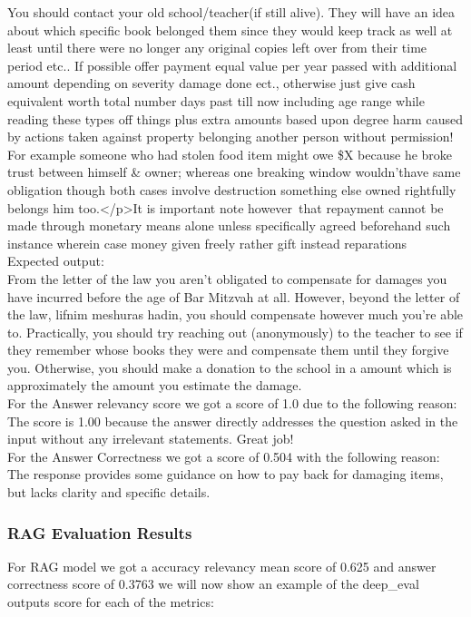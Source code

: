 \documentclass[11pt]{article}
\begin{document}
You should contact your old school/teacher(if still alive). They will have an idea about which specific book belonged them since they would keep track as well at least until there were no longer any original copies left over from their time period etc.. If possible offer payment equal value per year passed with additional amount depending on severity damage done ect., otherwise just give cash equivalent worth total number days past till now including age range while reading these types off things plus extra amounts based upon degree harm caused by actions taken against property belonging another person without permission! For example someone who had stolen food item might owe \$X because he broke trust between himself \& owner; whereas one breaking window wouldn'thave same obligation though both cases involve destruction something else owned rightfully belongs him too.</p>It is important note however that repayment cannot be made through monetary means alone unless specifically agreed beforehand such instance wherein case money given freely rather gift instead reparations \\

Expected output: \\


From the letter of the law you aren’t obligated to compensate for damages you have incurred before the age of Bar Mitzvah at all. However, beyond the letter of the law, lifnim meshuras hadin, you should compensate however much you’re able to.
Practically, you should try reaching out (anonymously) to the teacher to see if they remember whose books they were and compensate them until they forgive you.
Otherwise, you should make a donation to the school in a amount which is approximately the amount you estimate the damage. \\

For the Answer relevancy score we got a score of 1.0 due to the following reason: \\
The score is 1.00 because the answer directly addresses the question asked in the input without any irrelevant statements. Great job!\\

For the Answer Correctness  we got a score of 0.504 with the following reason: \\
The response provides some guidance on how to pay back for damaging items, but lacks clarity and specific details.


\subsubsection{RAG Evaluation Results}
For RAG model we got a accuracy relevancy mean score of 0.625 and answer correctness score of 0.3763 we will now show an example of the deep\_eval outputs score for each of the metrics:
\end{document}
